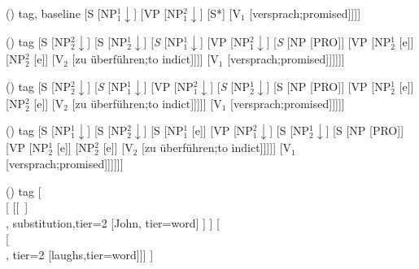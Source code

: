 \begin {forest}()
 tag, baseline [S [NP$_1^1\downarrow $] [VP [NP$_1^2\downarrow $] [S*] [V$_1$ [versprach;promised]]]] \end {forest}
\begin {forest}()
 tag [S [NP$_2^2\downarrow $] [S [NP$_2^1\downarrow $] [\textit {S} [NP$_1^1\downarrow $] [VP [NP$_1^2\downarrow $] [\textit {S} [NP [PRO]] [VP [NP$_2^1$ [e]] [NP$_2^2$ [e]] [V$_2$ [zu überführen;to indict]]]] [V$_1$ [versprach;promised]]]]]] \end {forest}
\begin {forest}()
 tag [S [NP$_2^2\downarrow $] [\textit {S} [NP$_1^1\downarrow $] [VP [NP$_1^2\downarrow $] [\textit {S} [NP$_2^1\downarrow $] [S [NP [PRO]] [VP [NP$_2^1$ [e]] [NP$_2^2$ [e]] [V$_2$ [zu überführen;to indict]]]]] [V$_1$ [versprach;promised]]]]] \end {forest}
\begin {forest}()
 tag [S [NP$_1^1\downarrow $] [S [NP$_2^2\downarrow $] [S [NP$_1^1$ [e]] [VP [NP$_1^2\downarrow $] [S [NP$_2^1\downarrow $] [S [NP [PRO]] [VP [NP$_2^1$ [e]] [NP$_2^2$ [e]] [V$_2$ [zu überführen;to indict]]]]] [V$_1$ [versprach;promised]]]]]] \end {forest}
\begin {forest}()
 tag [{\\ } [ [{[~]\\ }, substitution,tier=2 [John, tier=word] ] ] [{\\ } [{\\ }, tier=2 [laughs,tier=word]]] ] \end {forest}
